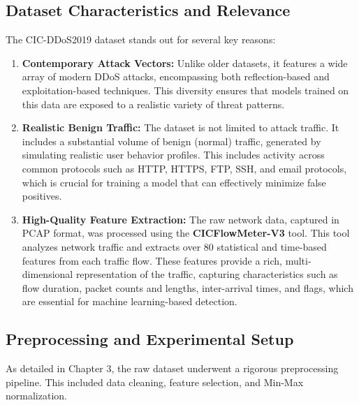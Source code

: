 \documentclass{report}
\begin{document}
\subsection{Dataset Characteristics and Relevance}
The CIC-DDoS2019 dataset stands out for several key reasons:

\begin{enumerate}     \item \textbf{Contemporary Attack Vectors:} Unlike older datasets, it features a wide array of modern DDoS attacks, encompassing both reflection-based and exploitation-based techniques. This diversity ensures that models trained on this data are exposed to a realistic variety of threat patterns.

    \item \textbf{Realistic Benign Traffic:} The dataset is not limited to attack traffic. It includes a substantial volume of benign (normal) traffic, generated by simulating realistic user behavior profiles. This includes activity across common protocols such as HTTP, HTTPS, FTP, SSH, and email protocols, which is crucial for training a model that can effectively minimize false positives.

    \item \textbf{High-Quality Feature Extraction:} The raw network data, captured in PCAP format, was processed using the \textbf{CICFlowMeter-V3} tool. This tool analyzes network traffic and extracts over 80 statistical and time-based features from each traffic flow. These features provide a rich, multi-dimensional representation of the traffic, capturing characteristics such as flow duration, packet counts and lengths, inter-arrival times, and flags, which are essential for machine learning-based detection.
\end{enumerate} 

\subsection{Preprocessing and Experimental Setup}
As detailed in Chapter 3, the raw dataset underwent a rigorous preprocessing pipeline. This included data cleaning, feature selection, and Min-Max normalization.
\end{document}
